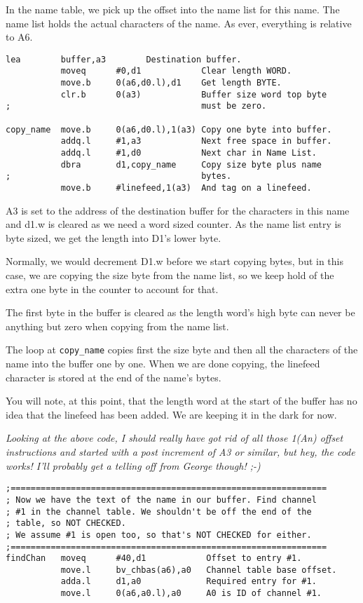 In the name table, we pick up the offset into the name list for this name. The name list holds the actual characters of the name. As ever, everything is relative to A6.

\begin{lstlisting}[firstnumber=last,caption={GetName - Copy Name to Buffer}]
           lea        buffer,a3        Destination buffer.
           moveq      #0,d1            Clear length WORD.
           move.b     0(a6,d0.l),d1    Get length BYTE.
           clr.b      0(a3)            Buffer size word top byte
;                                      must be zero.           

copy_name  move.b     0(a6,d0.l),1(a3) Copy one byte into buffer.
           addq.l     #1,a3            Next free space in buffer.
           addq.l     #1,d0            Next char in Name List.
           dbra       d1,copy_name     Copy size byte plus name 
;                                      bytes.
           move.b     #linefeed,1(a3)  And tag on a linefeed.
\end{lstlisting}

A3 is set to the address of the destination buffer for the characters in this name and d1.w is cleared as we need a word sized counter. As the name list entry is byte sized, we get the length into D1's lower byte.

Normally, we would decrement D1.w before we start copying bytes, but in this case, we are copying the size byte from the name list, so we keep hold of the extra one byte in the counter to account for that.

The first byte in the buffer is cleared as the length word's high byte can never be anything but zero when copying from the name list.

The loop at \texttt{copy\_name} copies first the size byte and then all the characters of the name into the buffer one by one. When we are done copying, the linefeed character is stored at the end of the name's bytes.

You will note, at this point, that the length word at the start of the buffer has no idea that the linefeed has been added. We are keeping it in the dark for now.

\emph{Looking at the above code, I should really have got rid of all those 1(An) offset instructions and started with a post increment of A3 or similar, but hey, the code works! I'll probably get a telling off from George though! ;-)}


\begin{lstlisting}[firstnumber=last,caption={GetName - Checking Channel \#1}]
;===============================================================
; Now we have the text of the name in our buffer. Find channel 
; #1 in the channel table. We shouldn't be off the end of the 
; table, so NOT CHECKED.
; We assume #1 is open too, so that's NOT CHECKED for either.
;===============================================================
findChan   moveq      #40,d1            Offset to entry #1.
           move.l     bv_chbas(a6),a0   Channel table base offset.
           adda.l     d1,a0             Required entry for #1.
           move.l     0(a6,a0.l),a0     A0 is ID of channel #1.
\end{lstlisting}

